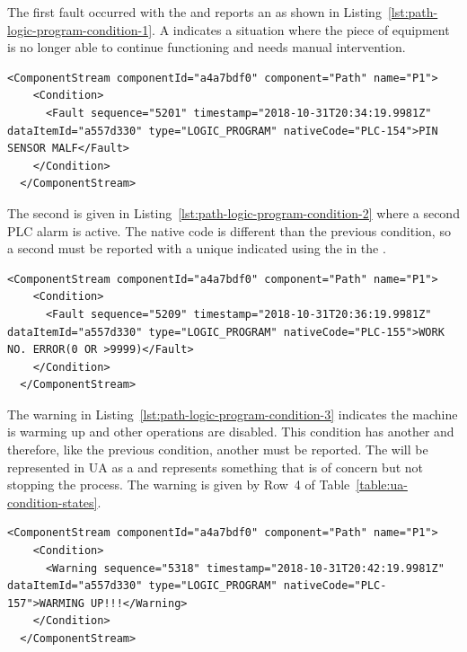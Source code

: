 The first fault occurred with the   and reports an   as shown in Listing~\ref{lst:path-logic-program-condition-1}. A  indicates a situation where the piece of equipment is no longer able to continue functioning and needs manual intervention.

\begin{lstlisting}[firstnumber=last,escapechar=|,%
    caption={Path Logic Program First Fault PLC-154},label={lst:path-logic-program-condition-1}]
  <ComponentStream componentId="a4a7bdf0" component="Path" name="P1">
    <Condition>
      <Fault sequence="5201" timestamp="2018-10-31T20:34:19.9981Z" dataItemId="a557d330" type="LOGIC_PROGRAM" nativeCode="PLC-154">PIN SENSOR MALF</Fault>
    </Condition>
  </ComponentStream>
\end{lstlisting}

The second  is given in Listing~\ref{lst:path-logic-program-condition-2} where a second PLC alarm is active. The native code is different than the previous condition, so a second  must be reported with a unique  indicated using the  in the . 

\begin{lstlisting}[firstnumber=last,escapechar=|,%
    caption={Path Logic Program Second Fault PLC-155},label={lst:path-logic-program-condition-2}]
  <ComponentStream componentId="a4a7bdf0" component="Path" name="P1">
    <Condition>
      <Fault sequence="5209" timestamp="2018-10-31T20:36:19.9981Z" dataItemId="a557d330" type="LOGIC_PROGRAM" nativeCode="PLC-155">WORK NO. ERROR(0 OR >9999)</Fault>
    </Condition>
  </ComponentStream>
\end{lstlisting}

The warning in Listing~\ref{lst:path-logic-program-condition-3} indicates the machine is warming up and other operations are disabled. This condition has another  and therefore, like the previous condition, another  must be reported. The  will be represented in UA as a  and represents something that is of concern but not stopping the process. The warning is given by Row~4 of Table~\ref{table:ua-condition-states}.

\begin{lstlisting}[firstnumber=last,escapechar=|,%
    caption={Path Logic Program Warning PLC-157},label={lst:path-logic-program-condition-3}]
  <ComponentStream componentId="a4a7bdf0" component="Path" name="P1">
    <Condition>
      <Warning sequence="5318" timestamp="2018-10-31T20:42:19.9981Z" dataItemId="a557d330" type="LOGIC_PROGRAM" nativeCode="PLC-157">WARMING UP!!!</Warning>
    </Condition>
  </ComponentStream>
\end{lstlisting}

